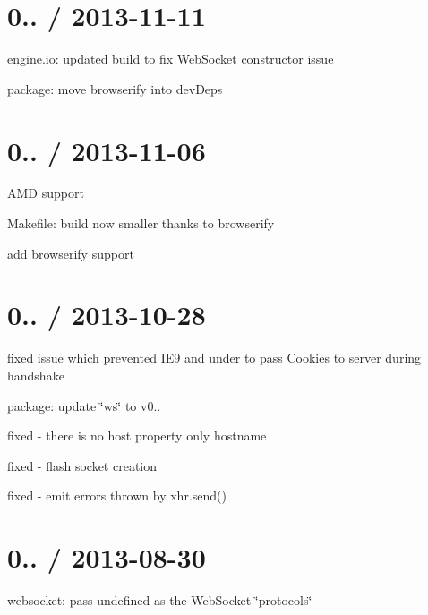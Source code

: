 \section*{0.. / 2013-\/11-\/11 }


\begin{DoxyItemize}
\item engine.\+io\+: updated build to fix Web\+Socket constructor issue
\item package\+: move browserify into dev\+Deps
\end{DoxyItemize}

\section*{0.. / 2013-\/11-\/06 }


\begin{DoxyItemize}
\item A\+MD support
\item Makefile\+: build now smaller thanks to browserify
\item add browserify support
\end{DoxyItemize}

\section*{0.. / 2013-\/10-\/28 }


\begin{DoxyItemize}
\item fixed issue which prevented I\+E9 and under to pass Cookies to server during handshake
\item package\+: update \char`\"{}ws\char`\"{} to v0..
\item fixed -\/ there is no host property only hostname
\item fixed -\/ flash socket creation
\item fixed -\/ emit errors thrown by xhr.\+send()
\end{DoxyItemize}

\section*{0.. / 2013-\/08-\/30 }


\begin{DoxyItemize}
\item websocket\+: pass {\ttfamily undefined} as the Web\+Socket \char`\"{}protocols\char`\"{}
\end{DoxyItemize}

